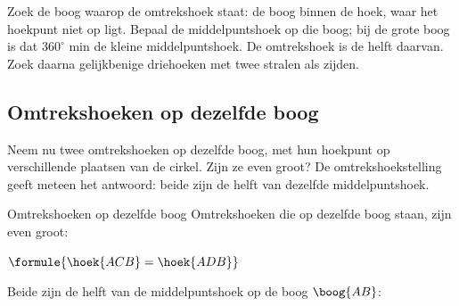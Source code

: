 \begin{werkwijze}
Zoek de boog waarop de omtrekshoek staat: de boog binnen de hoek, waar het hoekpunt niet op ligt. Bepaal de middelpuntshoek op die boog; bij de grote boog is dat $360^\circ$ min de kleine middelpuntshoek. De omtrekshoek is de helft daarvan. Zoek daarna gelijkbenige driehoeken met twee stralen als zijden.
\end{werkwijze}


\begin{oefeningen}
\end{oefeningen}

\subsection{Omtrekshoeken op dezelfde boog}

Neem nu twee omtrekshoeken op dezelfde boog, met hun hoekpunt op verschillende plaatsen van de cirkel. Zijn ze even groot? De omtrekshoekstelling geeft meteen het antwoord: beide zijn de helft van dezelfde middelpuntshoek.

\begin{theorie}
\begin{minipage}[t]{.64\linewidth}
\vspace{0pt}
\begin{stelling}{Omtrekshoeken op dezelfde boog}
Omtrekshoeken die op dezelfde boog staan, zijn even groot:

\vspace{1mm}
\qquad $\formule{\hoek{ACB} = \hoek{ADB}}$
\end{stelling}

\begin{bewijs}
Beide zijn de helft van de middelpuntshoek op de boog $\boog{AB}$:
\end{bewijs}
\end{minipage}\hfill
\begin{minipage}[t]{.32\linewidth}
\vspace{0pt}
\centering
{}
\end{minipage}
\end{theorie}

